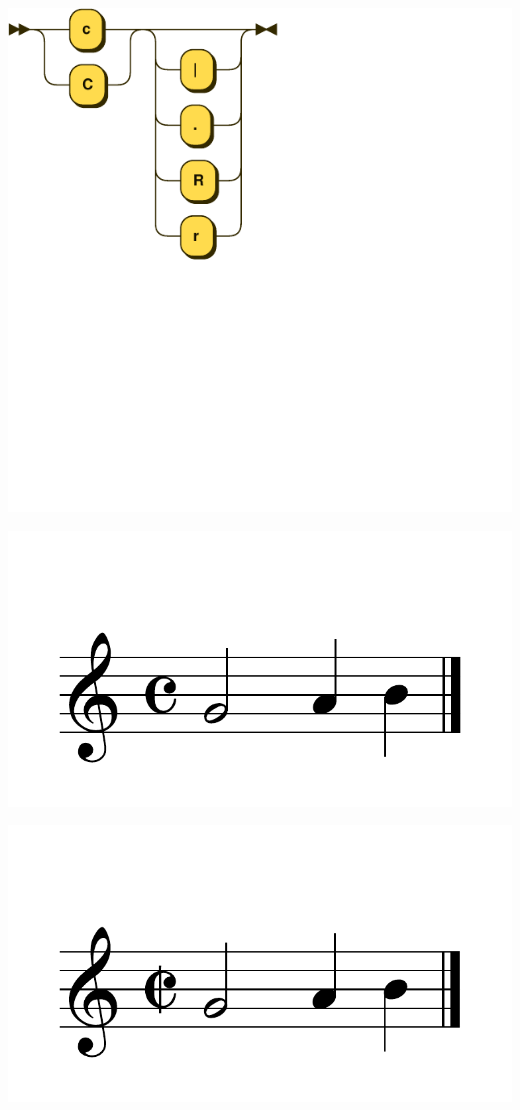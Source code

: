 \documentclass{article}
\begin{document}
\includegraphics[scale=0.5]{figures_railroad/pdf/skern/commonMeter.pdf}

\includegraphics[scale=0.5]{figures_tests/pdf/skern/commonmeter1.pdf}

\includegraphics[scale=0.5]{figures_tests/pdf/skern/commonmeter2.pdf}
\end{document}
